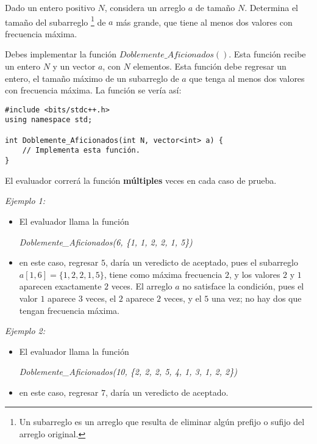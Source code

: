 \documentclass[12pt]{scrartcl}
\begin{document}
    
    
    \vspace{10pt}

    
    
        Dado un entero positivo $N$, considera un arreglo $a$ de tamaño $N$. Determina el tamaño del subarreglo \footnote{Un subarreglo es un arreglo que resulta de eliminar algún prefijo o sufijo del arreglo original.} de $a$ más grande, que tiene al menos dos valores con frecuencia máxima. 
    

       Debes implementar la función $Doblemente\_Aficionados()$. Esta función recibe un entero $N$ y un vector $a$, con $N$ elementos. Esta función debe regresar un entero, el tamaño máximo de un subarreglo de $a$ que tenga al menos dos valores con frecuencia máxima.
        La función se vería así:

\begin{verbatim}
#include <bits/stdc++.h>
using namespace std;

int Doblemente_Aficionados(int N, vector<int> a) {
    // Implementa esta función.
}
\end{verbatim}

    El evaluador correrá la función \textbf{múltiples} veces en cada caso de prueba.

    
        {\itshape Ejemplo 1:}
        \begin{itemize}
            \item El evaluador llama la función 

            \begin{center}
                {\itshape Doblemente\_Aficionados(6, \{1, 1, 2, 2, 1, 5\})}
            \end{center}
            
            \item en este caso, regresar $5$, daría un veredicto de aceptado, pues el subarreglo $a[1, 6] = \{1, 2, 2, 1, 5\}$, tiene como máxima frecuencia $2$, y los valores $2$ y $1$ aparecen exactamente $2$ veces. El arreglo $a$ no satisface la condición, pues el valor $1$ aparece $3$ veces, el $2$ aparece $2$ veces, y el $5$ una vez; no hay dos que tengan frecuencia máxima. 
        \end{itemize}
        
        {\itshape Ejemplo 2:}
        \begin{itemize}
            \item El evaluador llama la función 
            
            \begin{center}
                {\itshape Doblemente\_Aficionados(10, \{2, 2, 2, 5, 4, 1, 3, 1, 2, 2\})}
            \end{center}

            \item en este caso, regresar $7$, daría un veredicto de aceptado.
        \end{itemize}
        
\end{document}
